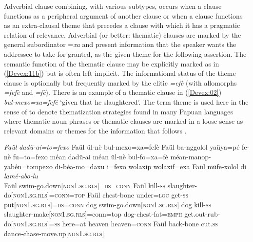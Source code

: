 \documentclass[output=paper]{LSP/langsci}
\begin{document}
Adverbial clause combining, with various subtypes, occurs when a clause functions as a peripheral argument of another clause or when a clause functions as an extra-clausal theme that precedes a clause with which it has a pragmatic relation of relevance. Adverbial (or better: thematic) clauses are marked by the general subordinator =\textit{xa} and present information that the speaker wants the addressee to take for granted, as the given theme for the following assertion. The semantic function of the thematic clause may be explicitly marked as in (\ref{Devex:11b}) but is often left implicit. The informational status of the theme clause is optionally but frequently marked by the  clitic \textit{=efè} (with allomorphs \textit{=fefè} and \textit{=fè}). There is an example of a thematic clause in (\ref{Devex:02}) \textit{bul‑mexo=xa=fefè} `given that he slaughtered'. The term theme is used here in the sense of \citet{Heeschen98} to denote thematization strategies found in many Papuan languages where thematic noun phrases or thematic clauses are marked in a loose sense as relevant domains or themes for the information that follows \citep[][814--816]{devries.2006}.


\begin{exe}
\ex \label{Devex:02}
\gll \textit{Faül} \textit{dadü-ai=to=fexo} Faül ül-nè bul-mexo=xa=fefè Faül ba-nggolol yaüya=pé fe-nè	fu=to=fexo méan dadü-ai méan ül-nè bul-fo=xa=fè méan-manop-yabén=tompexo di-béa-mo=daxu i=fexo wolaxip wolaxif=exa Faül müfe‑xolol di \textit{lamé‑abo‑lu}\\
Faül swim-go.down[\textsc{non1.sg.rls}]=\textsc{ds}=\textsc{conn} Faül kill-\textsc{ss} slaughter-do[\textsc{non1.sg.rls}]=\textsc{conn}=\textsc{top} Faül chest-bone under=\textsc{loc} get-\textsc{ss} put[\textsc{non1.sg.rls}]=\textsc{ds}=\textsc{conn} dog swim-go.down[\textsc{non1.sg.rls}] dog kill-\textsc{ss} slaughter‑make[\textsc{non1.sg.rls}]=conn=top dog-chest-fat=\textsc{emph} get.out-rub-do[\textsc{non1.sg.rls}]=\textsc{ss} here=at heaven heaven=\textsc{conn} Faül back‑bone cut.\textsc{ss} dance‑chase‑move.up[\textsc{non1.sg.rls}]\\
\glt {} \citep[][165]{enk97}\\
\end{exe}
\end{document}
